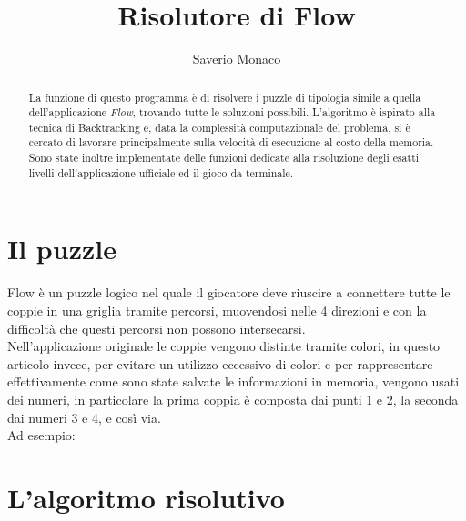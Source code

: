 \documentclass[11pt,a4paper,twocolumn]{IEEEtran}
\author{Saverio Monaco\\ \sepline}
\title{\textbf{Risolutore di Flow}}
\newcommand{\mysvg}[2]{}
\newcounter{algoritmo}
\begin{document}
	\maketitle
	\begin{abstract}
		La funzione di questo programma è di risolvere i puzzle di tipologia simile a quella dell'applicazione \textit{Flow}, trovando tutte le soluzioni possibili. L'algoritmo è ispirato alla tecnica di Backtracking e, data la complessità computazionale del problema, si è cercato di lavorare principalmente sulla velocità di esecuzione al costo della memoria.\\ Sono state inoltre implementate delle funzioni dedicate alla risoluzione degli esatti livelli dell'applicazione ufficiale ed il gioco da terminale.
	\end{abstract}
	\section{Il puzzle}
	Flow è un puzzle logico nel quale il giocatore deve riuscire a connettere tutte le coppie in una griglia tramite percorsi, muovendosi nelle 4 direzioni e con la difficoltà che questi percorsi non possono intersecarsi.\\
	Nell'applicazione originale le coppie vengono distinte tramite colori, in questo articolo invece, per evitare un utilizzo eccessivo di colori e per rappresentare effettivamente come sono state salvate le informazioni in memoria, vengono usati dei numeri, in particolare la prima coppia è composta dai punti 1 e 2, la seconda dai numeri 3 e 4, e così via.\\
	Ad esempio:
	
	\begin{figure}[h]
		\hspace*{0.2cm}
		\mysvg{Numberlink_puzzle}{4}
		\mysvg{Rightarrow}{06}
		\mysvg{Numberlink_puzzle_solution}{4}
	\end{figure}
	
	\section{L'algoritmo risolutivo}
\end{document}
